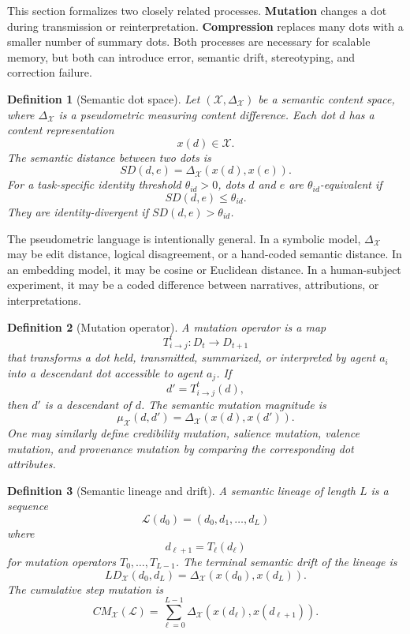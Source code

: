 \documentclass[11pt]{article}
\newtheorem{definition}{Definition}
\theoremstyle{remark}
\begin{document}
This section formalizes two closely related processes. \textbf{Mutation}
changes a dot during transmission or reinterpretation. \textbf{Compression}
replaces many dots with a smaller number of summary dots. Both processes
are necessary for scalable memory, but both can introduce error,
semantic drift, stereotyping, and correction failure.

\begin{definition}[Semantic dot space]\label{def:semantic-dot-space}
Let $(\mathcal X,\Delta_{\mathcal X})$ be a semantic content space,
where $\Delta_{\mathcal X}$ is a pseudometric measuring content
difference. Each dot $d$ has a content representation
$$
x(d)\in \mathcal X.
$$
The semantic distance between two dots is
$$
SD(d,e)=\Delta_{\mathcal X}(x(d),x(e)).
$$
For a task-specific identity threshold $\theta_{id}>0$, dots $d$ and
$e$ are $\theta_{id}$-equivalent if
$$
SD(d,e)\leq \theta_{id}.
$$
They are identity-divergent if $SD(d,e)>\theta_{id}$.
\end{definition}

The pseudometric language is intentionally general. In a symbolic model,
$\Delta_{\mathcal X}$ may be edit distance, logical disagreement, or a
hand-coded semantic distance. In an embedding model, it may be cosine or
Euclidean distance. In a human-subject experiment, it may be a coded
difference between narratives, attributions, or interpretations.

\begin{definition}[Mutation operator]\label{def:mutation-operator}
A mutation operator is a map
$$
T_{i\to j}^{t}:D_t\to D_{t+1}
$$
that transforms a dot held, transmitted, summarized, or interpreted by
agent $a_i$ into a descendant dot accessible to agent $a_j$. If
$$
d'=T_{i\to j}^{t}(d),
$$
then $d'$ is a descendant of $d$. The semantic mutation magnitude is
$$
\mu_{\mathcal X}(d,d')=\Delta_{\mathcal X}(x(d),x(d')).
$$
One may similarly define credibility mutation, salience mutation,
valence mutation, and provenance mutation by comparing the corresponding
dot attributes.
\end{definition}

\begin{definition}[Semantic lineage and drift]\label{def:semantic-lineage}
A semantic lineage of length $L$ is a sequence
$$
\mathcal L(d_0)=(d_0,d_1,\ldots,d_L)
$$
where
$$
d_{\ell+1}=T_{\ell}(d_{\ell})
$$
for mutation operators $T_0,\ldots,T_{L-1}$. The terminal semantic drift
of the lineage is
$$
LD_{\mathcal X}(d_0,d_L)=\Delta_{\mathcal X}(x(d_0),x(d_L)).
$$
The cumulative step mutation is
$$
CM_{\mathcal X}(\mathcal L)=
\sum_{\ell=0}^{L-1}
\Delta_{\mathcal X}(x(d_{\ell}),x(d_{\ell+1})).
$$
\end{definition}
\end{document}
